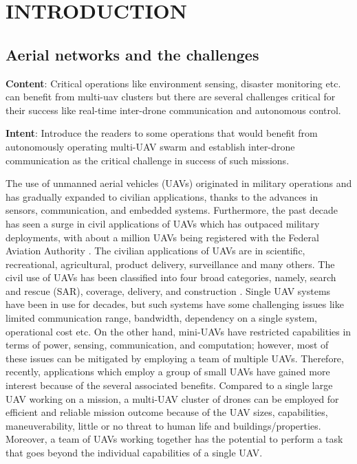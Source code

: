 \chapter{INTRODUCTION}
\label{chap-one}
\section{Aerial networks and the challenges}

\textbf{Content}: Critical operations like environment sensing, disaster monitoring etc. can benefit from multi-uav clusters but there are several challenges critical for their success like real-time inter-drone communication  and autonomous control. 

\textbf{Intent}: Introduce the readers to some operations that would benefit from autonomously operating multi-UAV swarm and establish inter-drone communication as the critical challenge in success of such missions.

The use of unmanned aerial vehicles (UAVs) originated in military operations and has gradually expanded to civilian applications, thanks to the advances in sensors, communication, and embedded systems. Furthermore, the past decade has seen a surge in civil applications of UAVs which has outpaced military deployments, with about a million UAVs being registered with the Federal Aviation Authority \cite{mydroneservices}. The civilian applications of UAVs are in scientific, recreational, agricultural, product delivery, surveillance and many others. The civil use of UAVs has been classified into four broad categories, namely, search and rescue (SAR), coverage, delivery, and construction \cite{7463007}.
Single UAV systems have been in use for decades, but such systems have some challenging issues like limited communication range, bandwidth, dependency on a single system, operational cost etc. On the other hand, mini-UAVs have restricted capabilities in terms of power, sensing, communication, and computation; however, most of these issues can be mitigated by employing a team of multiple UAVs. Therefore, recently, applications which employ a group of small UAVs have gained more interest because of the several associated benefits. Compared to a single large UAV working on a mission, a multi-UAV cluster of drones can be employed for efficient and reliable mission outcome because of the UAV sizes, capabilities, maneuverability, little or no threat to human life and buildings/properties. Moreover, a team of UAVs working together has the potential to perform a task that goes beyond the individual capabilities of a single UAV. 

